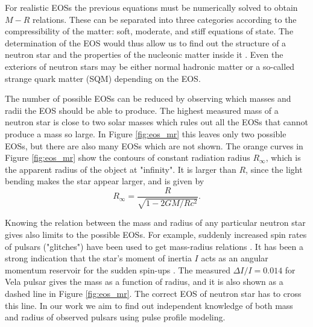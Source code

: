 \documentclass{wihuri}
\def\be{\begin{equation}}
\def\ee{\end{equation}}
\begin{document}
For realistic EOSs the previous equations must be numerically solved to obtain $M-R$ relations. These can be separated into three categories according to the compressibility of the matter: soft, moderate, and stiff equations of state. The determination of the EOS would thus allow us to find out the structure of a neutron star and the properties of the nucleonic matter inside it \cite{akmal}. Even the exteriors of neutron stars may be either normal hadronic matter or a so-called strange quark matter (SQM) depending on the EOS.  


The number of possible EOSs can be reduced by observing which masses and radii the EOS should be able to produce. %
The highest measured mass of a neutron star is close to two solar masses \cite{demorest} which rules out all the EOSs that cannot produce a mass so large. In Figure \ref{fig:eos_mr} this leaves only two possible EOSs, but there are also many EOSs which are not shown. %
The orange curves in Figure \ref{fig:eos_mr} show the contours of constant radiation radius $R_{\infty}$, which is the apparent radius of the object at "infinity". It is larger than $R$, since the light bending makes the star appear larger, and is given by \cite{lattimer2001}
\be \label{eq:rinfty}
R_{\infty} = \frac{R}{\sqrt{1-2GM/Rc^{2}}}.
\ee  

Knowing the relation between the mass and radius of any particular neutron star gives also limits to the possible EOSs. For example, suddenly increased spin rates of pulsars ("glitches") have been used to get mass-radius relations \cite{lattimer2001}. It has been a strong indication that the star's moment of inertia $I$ acts as an angular momentum reservoir for the sudden spin-ups \cite{link1999}. The measured $\Delta I / I = 0.014$  for Vela pulsar gives the mass as a function of radius, and it is also shown as a dashed line in Figure \ref{fig:eos_mr}. The correct EOS of neutron star has to cross this line. In our work we aim to find out independent knowledge %
of both mass and radius of observed pulsars using pulse profile modeling. 


\end{document}
